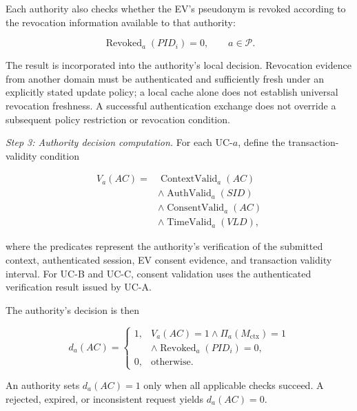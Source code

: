 \documentclass[twocolumn,10pt,journal]{IEEEtran}
\begin{document}
Each authority also checks whether the EV's
pseudonym is revoked according to the revocation
information available to that authority:

\begin{equation}
\operatorname{Revoked}_a(PID_i)=0,
\qquad a\in\mathcal{P}.
\label{eq:qsv2g_revocation}
\end{equation}

The result is incorporated into the authority's
local decision. Revocation evidence from another domain must be
authenticated and sufficiently fresh under an explicitly stated
update policy; a local cache alone does not establish universal
revocation freshness. A successful authentication
exchange does not override a subsequent policy
restriction or revocation condition.

\textit{Step 3: Authority decision computation.}
For each UC-$a$, define the transaction-validity
condition

\begin{equation}
\begin{aligned}
V_a(AC)={}&
\operatorname{ContextValid}_a(AC)\\
&\land\operatorname{AuthValid}_a(SID)\\
&\land\operatorname{ConsentValid}_a(AC)\\
&\land\operatorname{TimeValid}_a(VLD),
\end{aligned}
\label{eq:qsv2g_authority_validation}
\end{equation}

where the predicates represent the authority's
verification of the submitted context, authenticated
session, EV consent evidence, and transaction
validity interval. For UC-B and UC-C, consent
validation uses the authenticated verification
result issued by UC-A.

The authority's decision is then

\begin{equation}
d_a(AC)=
\begin{cases}
1, &
V_a(AC)=1
\land \Pi_a(M_{\mathrm{ctx}})=1\\
&\land
\operatorname{Revoked}_a(PID_i)=0,\\[2pt]
0, & \text{otherwise}.
\end{cases}
\label{eq:qsv2g_authority_decision}
\end{equation}

An authority sets $d_a(AC)=1$ only when all
applicable checks succeed. A rejected, expired,
or inconsistent request yields $d_a(AC)=0$.
\end{document}
